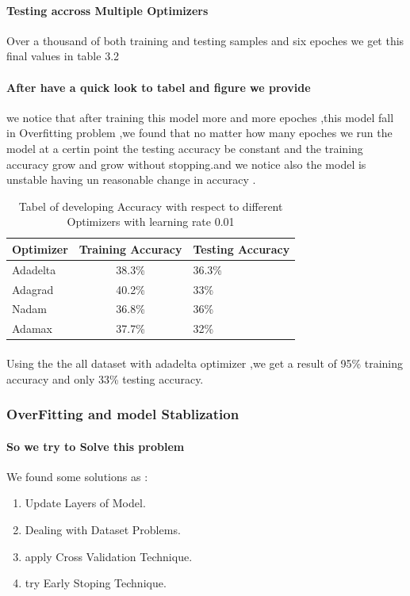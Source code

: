 \paragraph{Testing accross Multiple Optimizers}
Over a thousand of both training and testing samples and six epoches we get this final values in table 3.2

\paragraph{After have a quick look to tabel and figure we provide}
we notice that after training this model more and more epoches ,this model fall in Overfitting problem ,we found that no matter how many epoches we run the model at a certin point the testing accuracy be constant and the training accuracy grow and grow without stopping.and we notice also the model is unstable having un reasonable change in accuracy . 
\begin{table}[h!]
	\begin{center}
		\caption{Tabel of developing Accuracy with respect to different Optimizers with learning rate 0.01 \newline}
		\begin{tabular}{l|c|l}
			\textbf{Optimizer} & \textbf{Training Accuracy} & \textbf{Testing Accuracy}\\ 
			\hline 
			Adadelta & 38.3\% & 36.3\% \\
			Adagrad & 40.2\% & 33\%\\
			Nadam & 36.8\% & 36\% \\
			Adamax & 37.7\% & 32\% \\
		\end{tabular}
	\end{center}
\end{table}
\paragraph{}
Using the the all dataset with adadelta optimizer ,we get a result of 95\% training accuracy and only 33\% testing accuracy.
\subsubsection{OverFitting and model Stablization}
\paragraph{So we try to Solve this problem }
We found some solutions as :
\begin{enumerate}
	\item Update Layers of Model.
	\item Dealing with Dataset Problems.
	\item apply Cross Validation Technique.
	\item try Early Stoping Technique.
\end{enumerate}
